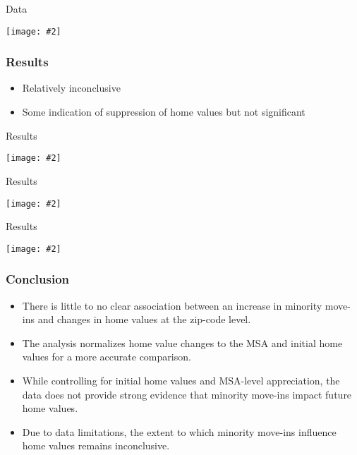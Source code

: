 \documentclass[aspectratio=169]{beamer}
\newcommand {\framedgraphic}[2] {
    \begin{frame}{#1}
        \begin{center}
            \texttt{[image: \#2]}
        \end{center}
    \end{frame}
}
\begin{document}
\framedgraphic{Data}{project_files/project_40_0.png}
\begin{frame}
\frametitle{Results}
\begin{itemize}
    \item Relatively inconclusive
    \item Some indication of suppression of home values but not significant
\end{itemize}
\end{frame}
\framedgraphic{Results}{project_files/project_43_1.png}
\framedgraphic{Results}{project_files/project_46_0.png}
\framedgraphic{Results}{project_files/project_49_1.png}
\begin{frame}
\frametitle{Conclusion}
\begin{itemize}
    \item There is little to no clear association between an increase in minority move-ins and changes in home values at the zip-code level.
    \item The analysis normalizes home value changes to the MSA and initial home values for a more accurate comparison.
    \item While controlling for initial home values and MSA-level appreciation, the data does not provide strong evidence that minority move-ins impact future home values.
    \item Due to data limitations, the extent to which minority move-ins influence home values remains inconclusive.
\end{itemize}
\end{frame}
\end{document}
